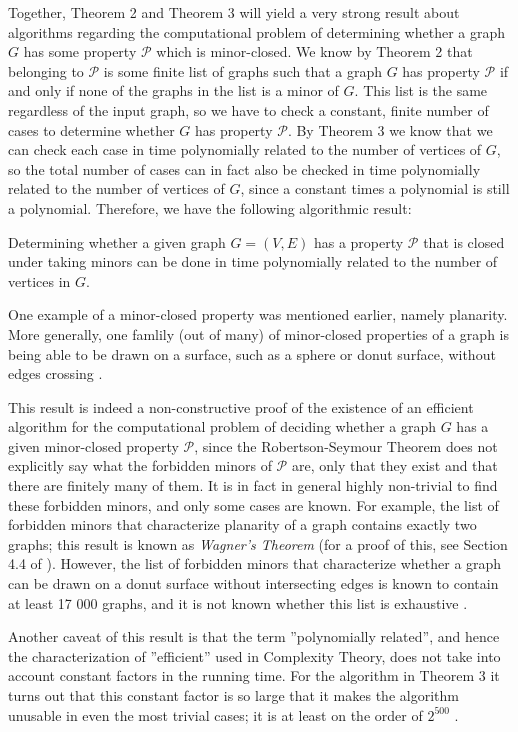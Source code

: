 Together, Theorem 2 and Theorem 3 will yield a very strong result about algorithms regarding the computational problem of determining whether a graph $G$ has some property $\mathcal{P}$ which is minor-closed. We know by Theorem 2 that belonging to $\mathcal{P}$ is some finite list of graphs such that a graph $G$ has property $\mathcal{P}$ if and only if none of the graphs in the list is a minor of $G$. This list is the same regardless of the input graph, so we have to check a constant, finite number of cases to determine whether $G$ has property $\mathcal{P}$. By Theorem 3 we know that we can check each case in time polynomially related to the number of vertices of $G$, so the total number of cases can in fact also be checked in time polynomially related to the number of vertices of $G$, since a constant times a polynomial is still a polynomial. Therefore, we have the following algorithmic result:
\begin{theorem}
Determining whether a given graph $G=(V, E)$ has a property $\mathcal{P}$ that is closed under taking minors can be done in time polynomially related to the number of vertices in $G$.
\end{theorem}

One example of a minor-closed property was mentioned earlier, namely planarity. More generally, one famlily (out of many) of minor-closed properties of a graph is being able to be drawn on a surface, such as a sphere or donut surface, without edges crossing \cite{GraphMinor2020}.

This result is indeed a non-constructive proof of the existence of an efficient algorithm for the computational problem of deciding whether a graph $G$ has a given minor-closed property $\mathcal{P}$, since the Robertson-Seymour Theorem does not explicitly say what the forbidden minors of $\mathcal{P}$ are, only that they exist and that there are finitely many of them. It is in fact in general highly non-trivial to find these forbidden minors, and only some cases are known. For example, the list of forbidden minors that characterize planarity of a graph contains exactly two graphs; this result is known as \emph{Wagner's Theorem} (for a proof of this, see Section 4.4 of \cite{diestelGraphTheory2017}). However, the list of forbidden minors that characterize whether a graph can be drawn on a donut surface without intersecting edges is known to contain at least 17 000 graphs, and it is not known whether this list is exhaustive \cite{ToroidalGraph2019}.

Another caveat of this result is that the term ''polynomially related'', and hence the characterization of ''efficient'' used in Complexity Theory, does not take into account constant factors in the running time. For the algorithm in Theorem 3 it turns out that this constant factor is so large that it makes the algorithm unusable in even the most trivial cases; it is at least on the order of $2^{500}$ \cite[p.~151]{downeyParameterizedComplexity1999}.

